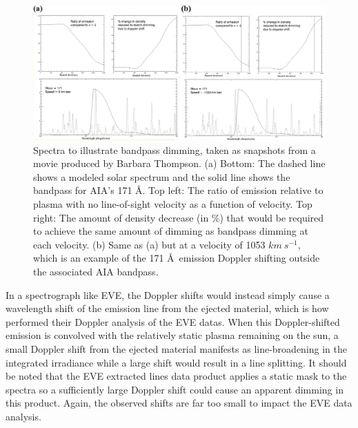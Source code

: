 \begin{figure}[!h]
    \begin{center}
        \includegraphics[width=166mm]{Images/BandpassDimming.png}
    \end{center}
    \caption[Bandpass dimming]{
        Spectra to illustrate bandpass dimming, taken as snapshots from a movie produced by Barbara Thompson. 
        (a) Bottom: The dashed line shows a modeled solar spectrum and the solid line shows the bandpass for AIA's 171 \AA. 
        Top left: The ratio of emission relative to plasma with no line-of-sight velocity as a function of velocity. 
        Top right: The amount of density decrease (in \%) that would be required to achieve the same amount of dimming as 
        bandpass dimming at each velocity. 
        (b) Same as (a) but at a velocity of 1053 $km\ s^{-1}$, which is an example of the 171 \AA\ emission Doppler 
        shifting outside the associated AIA bandpass. 
    }
    \label{bandpassDimming}
\end{figure}

In a spectrograph like EVE, the Doppler shifts would instead simply cause a wavelength shift of the emission line from the ejected material, which is how \citet{Hudson2011} performed their Doppler analysis of the EVE datas. When this Doppler-shifted emission is convolved with the relatively static plasma remaining on the sun, a small Doppler shift from the ejected material manifests as line-broadening in the integrated irradiance while a large shift would result in a line splitting. It should be noted that the EVE extracted lines data product applies a static mask to the spectra so a sufficiently large Doppler shift could cause an apparent dimming in this product. Again, the observed shifts are far too small to impact the EVE data analysis.

